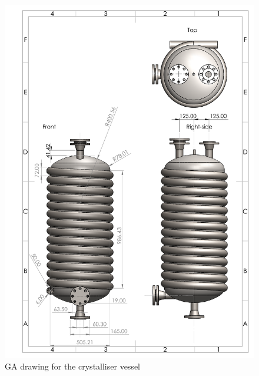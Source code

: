 \begin{figure}[h]
    \centering
    \includegraphics[scale=0.4]{chapters/3-separation/figures/Crystalliser_GA.PDF}
    \caption{GA drawing for the crystalliser vessel}
    \label{fig:crystalliser GA}
\end{figure} 

